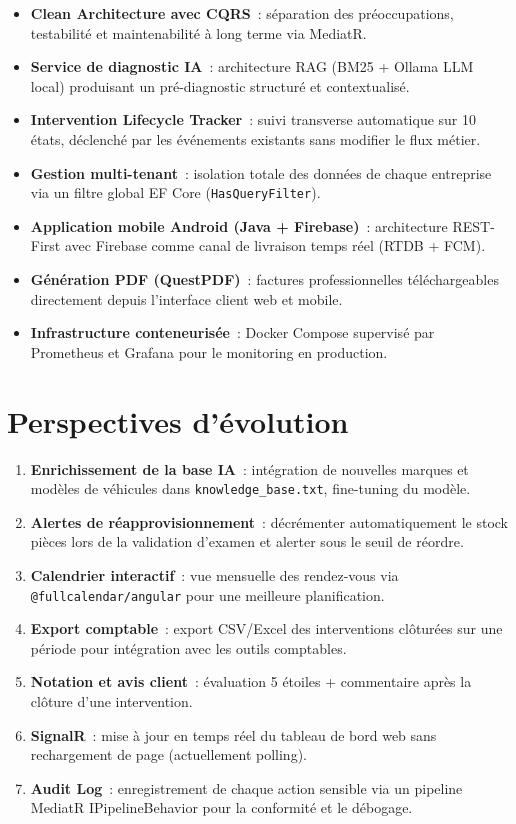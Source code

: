 \begin{itemize}[noitemsep,leftmargin=1.5em]
  \item \textbf{Clean Architecture avec CQRS}~: séparation des préoccupations,
    testabilité et maintenabilité à long terme via MediatR.
  \item \textbf{Service de diagnostic IA}~: architecture RAG (BM25 + Ollama LLM local)
    produisant un pré-diagnostic structuré et contextualisé.
  \item \textbf{Intervention Lifecycle Tracker}~: suivi transverse automatique sur
    10 états, déclenché par les événements existants sans modifier le flux métier.
  \item \textbf{Gestion multi-tenant}~: isolation totale des données de chaque
    entreprise via un filtre global EF Core (\texttt{HasQueryFilter}).
  \item \textbf{Application mobile Android (Java + Firebase)}~: architecture
    REST-First avec Firebase comme canal de livraison temps réel (RTDB + FCM).
  \item \textbf{Génération PDF (QuestPDF)}~: factures professionnelles téléchargeables
    directement depuis l'interface client web et mobile.
  \item \textbf{Infrastructure conteneurisée}~: Docker Compose supervisé par
    Prometheus et Grafana pour le monitoring en production.
\end{itemize}

\section*{Perspectives d'évolution}

\begin{enumerate}[noitemsep,leftmargin=1.5em]
  \item \textbf{Enrichissement de la base IA}~: intégration de nouvelles marques et
    modèles de véhicules dans \texttt{knowledge\_base.txt}, fine-tuning du modèle.
  \item \textbf{Alertes de réapprovisionnement}~: décrémenter automatiquement le stock
    pièces lors de la validation d'examen et alerter sous le seuil de réordre.
  \item \textbf{Calendrier interactif}~: vue mensuelle des rendez-vous via
    \texttt{@fullcalendar/angular} pour une meilleure planification.
  \item \textbf{Export comptable}~: export CSV/Excel des interventions clôturées
    sur une période pour intégration avec les outils comptables.
  \item \textbf{Notation et avis client}~: évaluation 5 étoiles + commentaire
    après la clôture d'une intervention.
  \item \textbf{SignalR}~: mise à jour en temps réel du tableau de bord web sans
    rechargement de page (actuellement polling).
  \item \textbf{Audit Log}~: enregistrement de chaque action sensible via un
    pipeline MediatR IPipelineBehavior pour la conformité et le débogage.
\end{enumerate}

